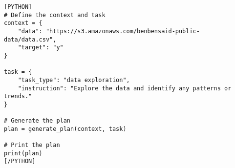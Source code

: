 \onecolumn
\begin{tcolorbox}[colback=blue!5!white, colframe=blue!75!black, title=Generated by CodeLlama-34B-Instruct in one task:, text width=\textwidth]
\begin{verbatim}
[PYTHON]
# Define the context and task
context = {
    "data": "https://s3.amazonaws.com/benbensaid-public-data/data.csv",
    "target": "y"
}

task = {
    "task_type": "data exploration",
    "instruction": "Explore the data and identify any patterns or trends."
}

# Generate the plan
plan = generate_plan(context, task)

# Print the plan
print(plan)
[/PYTHON]
\end{verbatim}
\end{tcolorbox}